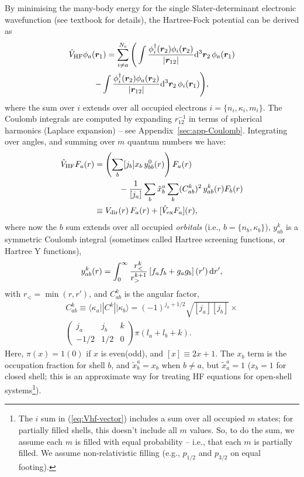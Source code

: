 \documentclass[10pt,twocolumn,a4paper]{article}%
\newcommand{\bra}[1]{\ensuremath{\langle #1|}}	%
\newcommand{\ket}[1]{\ensuremath{|#1\rangle}}	%
\newcommand{\threej}[6]{\ensuremath{\begin{pmatrix}#1&#2&#3\\#4&#5&#6\end{pmatrix}}}	%
\renewcommand{\v}[1]{\ensuremath{\boldsymbol{#1}}}		%
\newcommand{\be}{\begin{equation}}
\newcommand{\ee}{\end{equation}}
\def\d{\ensuremath{{\rm d}}}
\renewcommand{\k}{\ensuremath{\kappa}}
\begin{document}
By minimising the many-body energy for the single Slater-determinant electronic wavefunction (see textbook \cite{JohnsonBook2007} for details), the Hartree-Fock potential can be derived as
\begin{multline}\label{eq:Vhf-vector}
\hat V_{\rm HF}\phi_a(\v{r}_1) = \sum_{i\neq a}^{N_c}\Bigg(
\int \frac{\phi_i^\dag(\v{r}_2)\phi_i(\v{r}_2)}{|\v{r}_{12}|}\d^3\v{r}_2\,\phi_a(\v{r}_1)\\
-\int \frac{\phi_i^\dag(\v{r}_2)\phi_a(\v{r}_2)}{|\v{r}_{12}|}\d^3\v{r}_2\,\phi_i(\v{r}_1)
\Bigg),
\end{multline}
where the sum over $i$ extends over all occupied electrons $i=\{n_i,\k_i,m_i\}$.
The Coulomb integrals are computed by expanding ${r}_{12}^{-1}$ in terms of spherical harmonics (Laplace expansion) -- see Appendix~\ref{sec:app-Coulomb}.
Integrating over angles, and summing over $m$ quantum numbers we have:
\begin{align}
\label{eq:Vhf-radial}
\hat V_{\rm HF}F_a(r)& = \left(\sum_b [j_b] x_b  \,  y^0_{bb}(r)\right)F_a(r)
\notag \\  & \qquad\quad
-\frac{1}{[j_a]}\sum_b \tilde x_b^{a}\sum_k (C^k_{ab})^2\, y^k_{ab}(r) F_b(r)  \\
\label{eq:Vhf}
&\equiv V_{\rm dir}(r)\,F_a(r) + [\hat V_{\rm ex}F_a](r),
\end{align}
where now the $b$ sum extends over all occupied {\em orbitals} (i.e., $b=\{n_b,\k_b\}$),
$y_{ab}^k$ is a symmetric Coulomb integral (sometimes called Hartree screening functions, or Hartree Y functions),
%
\be\label{eq:ykab}
y^k_{ab}(r) = \int_0^\infty \frac{r_<^k}{r_>^{k+1}}\left[f_a f_b + g_a g_b\right](r')\, \d r',
\ee
with $r_{<} = \min(r,r')$, and
$C^k_{ab}$ is the angular factor,
%
\begin{multline}\label{eq:Ckab}
C^k_{ab}\equiv\bra{\k_a}|C^k|\ket{\k_b} = (-1)^{j_a+1/2}\sqrt{[j_a][j_b]}\times\\\threej{j_a}{j_b}{k}{-1/2}{1/2}{0}\pi(l_a+l_b+k).
\end{multline}
Here, $\pi(x)=1(0)$ if $x$ is even(odd), and $[x]\equiv2x+1$. 
The $x_b$ term is the occupation fraction for shell $b$, and
$\tilde x^a_b = x_b$ when $b\neq a$, but $\tilde x^a_a = 1$
($x_b=1$ for closed shell; this is an approximate way for treating HF equations for open-shell systems\footnote{The $i$ sum in (\ref{eq:Vhf-vector}) includes a sum over all occupied $m$ states; for partially filled shells, this doesn't include all $m$ values. So, to do the sum, we assume each $m$ is filled with equal probability -- i.e., that each $m$ is partially filled. We assume non-relativistic filling (e.g., $p_{1/2}$ and $p_{3/2}$ on equal footing).}).
\end{document}
